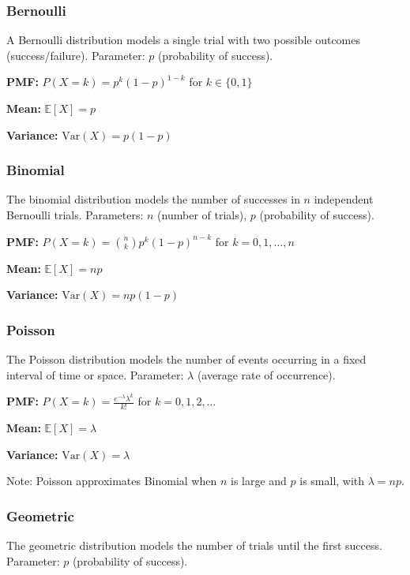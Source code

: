 \subsubsection{Bernoulli}

A Bernoulli distribution models a single trial with two possible outcomes (success/failure). Parameter: $p$ (probability of success).

\textbf{PMF:} $P(X = k) = p^k(1-p)^{1-k}$ for $k \in \{0, 1\}$

\textbf{Mean:} $\mathbb{E}[X] = p$

\textbf{Variance:} $\text{Var}(X) = p(1-p)$

\subsubsection{Binomial}

The binomial distribution models the number of successes in $n$ independent Bernoulli trials. Parameters: $n$ (number of trials), $p$ (probability of success).

\textbf{PMF:} $P(X = k) = \binom{n}{k} p^k (1-p)^{n-k}$ for $k = 0, 1, \ldots, n$

\textbf{Mean:} $\mathbb{E}[X] = np$

\textbf{Variance:} $\text{Var}(X) = np(1-p)$

\subsubsection{Poisson}

The Poisson distribution models the number of events occurring in a fixed interval of time or space. Parameter: $\lambda$ (average rate of occurrence).

\textbf{PMF:} $P(X = k) = \frac{e^{-\lambda} \lambda^k}{k!}$ for $k = 0, 1, 2, \ldots$

\textbf{Mean:} $\mathbb{E}[X] = \lambda$

\textbf{Variance:} $\text{Var}(X) = \lambda$

Note: Poisson approximates Binomial when $n$ is large and $p$ is small, with $\lambda = np$.

\subsubsection{Geometric}

The geometric distribution models the number of trials until the first success. Parameter: $p$ (probability of success).

